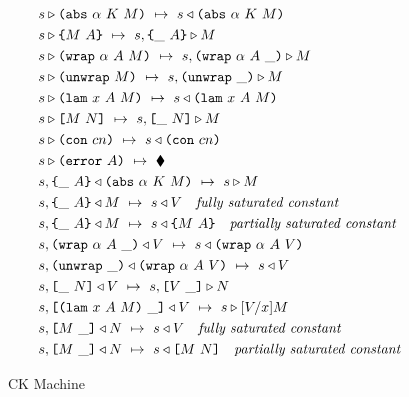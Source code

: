 \documentclass[../main.tex]{subfiles}
\begin{document}
\begin{figure*}[t]
    
    \begin{align*}
        &s \triangleright \texttt{(} \texttt{abs} ~ \alpha ~ K ~ M \texttt{)} ~\mapsto~ s \triangleleft \texttt{(} \texttt{abs} ~ \alpha ~ K ~ M \texttt{)}\\
        &s \triangleright \texttt{\{}M ~ A\texttt{\}} ~\mapsto~ s, \texttt{\{}\_ ~ A\texttt{\}} \triangleright M\\
        &s \triangleright \texttt{(} \texttt{wrap} ~ \alpha ~ A ~ M \texttt{)} ~\mapsto~ s, \texttt{(} \texttt{wrap} ~ \alpha ~ A ~ \_ \texttt{)} \triangleright M\\
        &s \triangleright \texttt{(} \texttt{unwrap} ~ M \texttt{)} ~\mapsto~ s, \texttt{(} \texttt{unwrap} ~ \_ \texttt{)}{} \triangleright M\\
        &s \triangleright \texttt{(} \texttt{lam} ~ x ~ A ~ M \texttt{)} ~\mapsto~ s \triangleleft \texttt{(} \texttt{lam} ~ x ~ A ~ M \texttt{)}\\
        &s \triangleright \texttt{[} M ~ N \texttt{]} ~\mapsto~ s, \texttt{[} \_ ~ N \texttt{]} \triangleright M\\
        &s \triangleright \texttt{(} \texttt{con} ~ cn \texttt{)} ~\mapsto~ s \triangleleft \texttt{(} \texttt{con} ~ cn \texttt{)}\\
        &s \triangleright \texttt{(} \texttt{error} ~ A \texttt{)} ~\mapsto~ \blacklozenge{}\\
        &s, \texttt{\{}\_ ~ A\texttt{\}} \triangleleft \texttt{(} \texttt{abs} ~ \alpha ~ K ~ M \texttt{)} ~\mapsto~ s \triangleright M\\
        &s, \texttt{\{}\_ ~ A\texttt{\}} \triangleleft M ~\mapsto~ s \triangleleft V \quad \textit{fully saturated constant}\\
        &s, \texttt{\{}\_ ~ A\texttt{\}} \triangleleft M ~\mapsto~ s \triangleleft \texttt{\{}M ~ A\texttt{\}} \quad \textit{partially saturated constant}\\
        &s, \texttt{(} \texttt{wrap} ~ \alpha ~ A ~ \_ \texttt{)} \triangleleft V ~\mapsto~ s \triangleleft \texttt{(} \texttt{wrap} ~ \alpha ~ A ~ V \texttt{)}\\
        &s, \texttt{(} \texttt{unwrap} ~ \_ \texttt{)}{} \triangleleft \texttt{(} \texttt{wrap} ~ \alpha ~ A ~ V \texttt{)} ~\mapsto~ s \triangleleft V\\
        &s, \texttt{[} \_ ~ N \texttt{]} \triangleleft V ~\mapsto~ s, \texttt{[} V ~ \_ \texttt{]} \triangleright N\\
        &s, \texttt{[} \texttt{(} \texttt{lam} ~ x ~ A ~ M \texttt{)} ~ \_ \texttt{]} \triangleleft V ~\mapsto~ s \triangleright [V/x]M\\
        &s,\texttt{[} M ~ \_ \texttt{]} \triangleleft N ~\mapsto~ s \triangleleft V \quad \textit{fully saturated constant}\\
        &s,\texttt{[} M ~ \_ \texttt{]} \triangleleft N ~\mapsto~ s \triangleleft \texttt{[} M ~ N \texttt{]} \quad \textit{partially saturated constant}\\
    \end{align*}
    
    \caption{CK Machine}
    \label{fig:Plutus_core_ck_machine}
\end{figure*}
\end{document}
